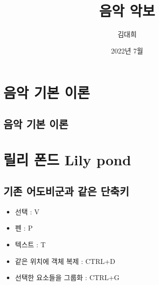 \documentclass[12pt, a4paper, oneside]{book}
\begin{document}
	
			\dominitoc
			

			\title{음악 악보}
			\author{김대희}
			\date{2022년 7월}
			\maketitle


			\tableofcontents
			\listoffigures
			\listoftables

			

	\newpage
	\chapter{음악 기본 이론}


		\newpage
		\minitoc				%


	\newpage  \null
	\section{음악 기본 이론}



	\newpage
	\chapter{ 릴리 폰드 Lily pond } 


		\newpage
		\minitoc				%


	\newpage  \null


	\section{기존 어도비군과 같은 단축키}
			\begin{itemize}[topsep=0.0em, parsep=0.0em, itemsep=0em, leftmargin=6.0em, labelwidth=3em, labelsep=1em] 
			\item 	선택 : V
			\item 	펜 : P
			\item 	텍스트 : T
			\item 	같은 위치에 객체 복제 : CTRL+D
			\item 	선택한 요소들을 그룹화 :  CTRL+G
			\end{itemize}
\end{document}
